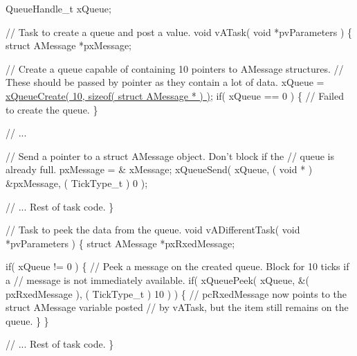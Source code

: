 \begin{DoxyPre}QueueHandle\_t xQueue;\end{DoxyPre}



\begin{DoxyPre}// Task to create a queue and post a value.
void vATask( void *pvParameters )
\{
struct AMessage *pxMessage;\end{DoxyPre}



\begin{DoxyPre} // Create a queue capable of containing 10 pointers to AMessage structures.
 // These should be passed by pointer as they contain a lot of data.
 xQueue = \hyperlink{vendor_2ceedling_2plugins_2freertos_2src_2freertos_2include_2queue_8h_aeb858b824bd74a934ea7ebb81af2a6bb}{xQueueCreate( 10, sizeof( struct AMessage * ) )};
 if( xQueue == 0 )
 \{
     // Failed to create the queue.
 \}\end{DoxyPre}



\begin{DoxyPre} // ...\end{DoxyPre}



\begin{DoxyPre} // Send a pointer to a struct AMessage object.  Don't block if the
 // queue is already full.
 pxMessage = \& xMessage;
 xQueueSend( xQueue, ( void * ) \&pxMessage, ( TickType\_t ) 0 );\end{DoxyPre}



\begin{DoxyPre} // ... Rest of task code.
\}\end{DoxyPre}



\begin{DoxyPre}// Task to peek the data from the queue.
void vADifferentTask( void *pvParameters )
\{
struct AMessage *pxRxedMessage;\end{DoxyPre}



\begin{DoxyPre} if( xQueue != 0 )
 \{
     // Peek a message on the created queue.  Block for 10 ticks if a
     // message is not immediately available.
     if( xQueuePeek( xQueue, \&( pxRxedMessage ), ( TickType\_t ) 10 ) )
     \{
         // pcRxedMessage now points to the struct AMessage variable posted
         // by vATask, but the item still remains on the queue.
     \}
 \}\end{DoxyPre}



\begin{DoxyPre} // ... Rest of task code.
\}
\end{DoxyPre}
 